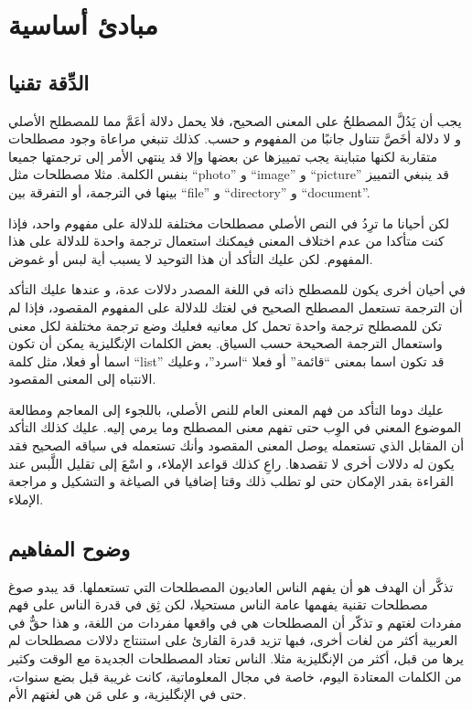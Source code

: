 
\section[ref:34314226]{مبادئ أساسية}
\subsection{الدِّقة تقنيا}
يجب أن يَدُلَّ المصطلحُ على المعنى الصحيح، فلا يحمل دلالة أعَمَّ مما
للمصطلح الأصلي و لا دلالة أخَصَّ تتناول جانبًا من المفهوم و حسب. كذلك
تنبغي مراعاة وجود مصطلحات متقاربة لكنها متباينة يجب تمييزها عن بعضها
وإلا قد ينتهي الأمر إلى ترجمتها جميعا بنفس الكلمة. مثلا مصطلحات مثل
“photo” و “image” و “picture” قد ينبغي التمييز بينها في الترجمة، أو
التفرقة بين “file” و “directory” و “document”.

لكن أحيانا ما ترِدُ في النص الأصلي مصطلحات مختلفة للدلالة على مفهوم
واحد، فإذا كنت متأكدا من عدم اختلاف المعنى فيمكنك استعمال ترجمة واحدة
للدلالة على هذا المفهوم. لكن عليك التأكد أن هذا التوحيد لا يسبب أية لبس
أو غموض.

في أحيان أخرى يكون للمصطلح ذاته في اللغة المصدر دلالات عدة، و عندها عليك
التأكد أن الترجمة تستعمل المصطلح الصحيح في لغتك للدلالة على المفهوم
المقصود، فإذا لم تكن للمصطلح ترجمة واحدة تحمل كل معانيه فعليك وضع ترجمة
مختلفة لكل معنى واستعمال الترجمة الصحيحة حسب السياق. بعض الكلمات
الإنگليزية يمكن أن تكون اسما أو فعلا، مثل كلمة “list” قد تكون اسما
بمعنى “قائمة” أو فعلا “اسرد”، وعليك الانتباه إلى المعنى المقصود.

عليك دوما التأكد من فهم المعنى العام للنص الأصلي، باللجوء إلى المعاجم
ومطالعة الموضوع المعني في الوِب حتى تفهم معنى المصطلح وما يرمي إليه.
عليك كذلك التأكد أن المقابل الذي تستعمله يوصل المعنى المقصود وأنك
تستعمله في سياقه الصحيح فقد يكون له دلالات أخرى لا تقصدها. راعِ كذلك
قواعد الإملاء، و اسْعَ إلى تقليل اللَّبس عند القراءة بقدر الإمكان حتى
لو تطلب ذلك وقتا إضافيا في الصياغة و التشكيل و مراجعة الإملاء.

\subsection{وضوح المفاهيم}
تذكَّر أن الهدف هو أن يفهم الناس العاديون المصطلحات التي تستعملها. قد
يبدو صوغ مصطلحات تقنية يفهمها عامة الناس مستحيلا، لكن ثِق في قدرة الناس
على فهم مفردات لغتهم و تذكّر أن المصطلحات هي في واقعها مفردات من اللغة،
و هذا حقٌّ في العربية أكثر من لغات أخرى، فبها تزيد قدرة القارئ على
استنتاج دلالات مصطلحات لم يرها من قبل، أكثر من الإنگليزية مثلا. الناس
تعتاد المصطلحات الجديدة مع الوقت وكثير من الكلمات المعتادة اليوم، خاصة
في مجال المعلوماتية، كانت غريبة قبل بضع سنوات، حتى في الإنگليزية، و على
مَن هي لغتهم الأم.

